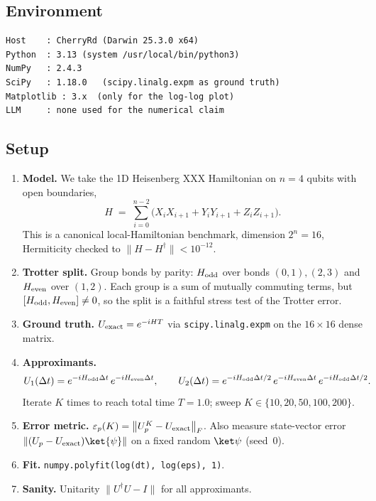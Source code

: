 \documentclass[11pt]{article}
\begin{document}
\subsection{Environment}
\begin{lstlisting}
Host    : CherryRd (Darwin 25.3.0 x64)
Python  : 3.13 (system /usr/local/bin/python3)
NumPy   : 2.4.3
SciPy   : 1.18.0   (scipy.linalg.expm as ground truth)
Matplotlib : 3.x  (only for the log-log plot)
LLM     : none used for the numerical claim
\end{lstlisting}

\subsection{Setup}
\begin{enumerate}
  \item \textbf{Model.} We take the 1D Heisenberg XXX Hamiltonian on
    $n=4$ qubits with open boundaries,
    \[
      H \;=\; \sum_{i=0}^{n-2}\bigl(X_iX_{i+1}+Y_iY_{i+1}+Z_iZ_{i+1}\bigr).
    \]
    This is a canonical local-Hamiltonian benchmark, dimension $2^n=16$,
    Hermiticity checked to $\|H-H^\dagger\|<10^{-12}$.
  \item \textbf{Trotter split.} Group bonds by parity:
    $H_{\rm odd}$ over bonds $(0,1),(2,3)$ and $H_{\rm even}$ over
    $(1,2)$. Each group is a sum of mutually commuting terms, but
    $[H_{\rm odd},H_{\rm even}]\neq 0$, so the split is a faithful stress
    test of the Trotter error.
  \item \textbf{Ground truth.} $U_{\rm exact} = e^{-iHT}$ via
    \texttt{scipy.linalg.expm} on the $16\times 16$ dense matrix.
  \item \textbf{Approximants.}
    \[
      U_1(\Delta t) = e^{-iH_{\rm odd}\Delta t}\,e^{-iH_{\rm even}\Delta t},\qquad
      U_2(\Delta t) = e^{-iH_{\rm odd}\Delta t/2}\,e^{-iH_{\rm even}\Delta t}\,e^{-iH_{\rm odd}\Delta t/2}.
    \]
    Iterate $K$ times to reach total time $T=1.0$; sweep
    $K\in\{10,20,50,100,200\}$.
  \item \textbf{Error metric.}
    $\varepsilon_p(K) = \bigl\|U_p^{K} - U_{\rm exact}\bigr\|_F$.
    Also measure state-vector error $\|(U_p-U_{\rm exact})\ket{\psi}\|$
    on a fixed random $\ket\psi$ (seed~0).
  \item \textbf{Fit.} \texttt{numpy.polyfit(log(dt), log(eps), 1)}.
  \item \textbf{Sanity.} Unitarity $\|U^\dagger U - I\|$ for all approximants.
\end{enumerate}
\end{document}
